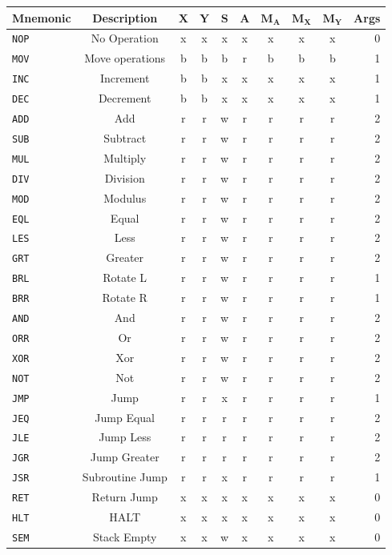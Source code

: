 \documentclass{article}
\newcommand{\x}{$\textbf{X}$}
\newcommand{\y}{$\textbf{Y}$}
\newcommand{\s}{$\textbf{S}$}
\newcommand{\A}{$\textbf{A}$}
\newcommand{\mx}{$\textbf{M}_{\textbf{X}}$}
\newcommand{\my}{$\textbf{M}_{\textbf{Y}}$}
\newcommand{\ma}{$\textbf{M}_{\textbf{A}}$}
\newcommand{\V}{\verb}
\begin{document}
\begin{tabular}{l || c | *{7}{c|} | r}
\textbf{Mnemonic} & \textbf{Description} & \x & \y& \s & \A &\ma & \mx & \my &
Args
\\
\hline
\V+NOP+ & No Operation & x & x & x & x & x & x & x & 0  \\
\hline
\V+MOV+ & Move operations & b & b & b & r & b & b & b & 1 \\
\hline
\V+INC+ & Increment& b & b & x & x & x & x & x & 1 \\
\V+DEC+ & Decrement	& b & b & x & x & x & x & x & 1 \\
\V+ADD+ & Add		& r & r & w & r & r & r & r & 2 \\
\V+SUB+ & Subtract	& r & r & w & r & r & r & r & 2 \\
\V+MUL+ & Multiply	& r & r & w & r & r & r & r & 2 \\
\V+DIV+ & Division	& r & r & w & r & r & r & r & 2 \\
\V+MOD+ & Modulus	& r & r & w & r & r & r & r & 2 \\
\hline
\V+EQL+ & Equal		& r & r & w & r & r & r & r & 2 \\
\V+LES+ & Less		& r & r & w & r & r & r & r & 2 \\
\V+GRT+ & Greater 	& r & r & w & r & r & r & r & 2 \\
\V+BRL+ & Rotate L	& r & r & w & r & r & r & r & 1 \\
\V+BRR+ & Rotate R	& r & r & w & r & r & r & r & 1 \\
\V+AND+ & And		& r & r & w & r & r & r & r & 2 \\
\V+ORR+ & Or 		& r & r & w & r & r & r & r & 2 \\
\V+XOR+ & Xor		& r & r & w & r & r & r & r & 2 \\
\V+NOT+ & Not		& r & r & w & r & r & r & r & 2 \\
\hline
\V+JMP+ & Jump		& r & r & x & r & r & r & r & 1 \\
\V+JEQ+ & Jump Equal& r & r & r & r & r & r & r & 2 \\
\V+JLE+ & Jump Less	& r & r & r & r & r & r & r & 2 \\
\V+JGR+ & Jump Greater& r & r & r & r & r & r & r & 2 \\
\V+JSR+ & Subroutine Jump& r & r & x & r & r & r & r & 1 \\
\V+RET+ & Return Jump& x & x & x & x & x & x & x & 0 \\
\hline
\V+HLT+ & HALT& x & x & x & x & x & x & x & 0 \\
\V+SEM+ & Stack Empty& x & x & w & x & x & x & x & 0 \\
\end{tabular}
 
\end{document}
